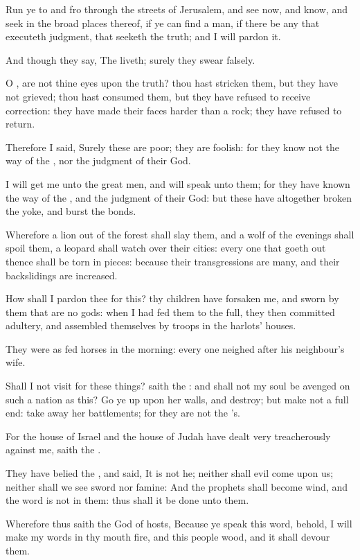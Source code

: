 \Chapter
\Verse Run ye to and fro through the streets of Jerusalem, and see now, and know, and seek in the broad places thereof, if ye can find a man, if there be any that executeth judgment, that seeketh the truth; and I will pardon it.

\Verse And though they say, The \LORD liveth; surely they swear falsely.

\Verse O \LORD, are not thine eyes upon the truth? thou hast stricken them, but they have not grieved; thou hast consumed them, but they have refused to receive correction: they have made their faces harder than a rock; they have refused to return.

\Verse Therefore I said, Surely these are poor; they are foolish: for they know not the way of the \LORD, nor the judgment of their God.

\Verse I will get me unto the great men, and will speak unto them; for they have known the way of the \LORD, and the judgment of their God: but these have altogether broken the yoke, and burst the bonds.

\Verse Wherefore a lion out of the forest shall slay them, and a wolf of the evenings shall spoil them, a leopard shall watch over their cities: every one that goeth out thence shall be torn in pieces: because their transgressions are many, and their backslidings are increased.

\Verse How shall I pardon thee for this? thy children have forsaken me, and sworn by them that are no gods: when I had fed them to the full, they then committed adultery, and assembled themselves by troops in the harlots' houses.

\Verse They were as fed horses in the morning: every one neighed after his neighbour's wife.

\Verse Shall I not visit for these things? saith the \LORD: and shall not my soul be avenged on such a nation as this?  \Verse Go ye up upon her walls, and destroy; but make not a full end: take away her battlements; for they are not the \LORD's.

\Verse For the house of Israel and the house of Judah have dealt very treacherously against me, saith the \LORD.

\Verse They have belied the \LORD, and said, It is not he; neither shall evil come upon us; neither shall we see sword nor famine: \Verse And the prophets shall become wind, and the word is not in them: thus shall it be done unto them.

\Verse Wherefore thus saith the \LORD God of hosts, Because ye speak this word, behold, I will make my words in thy mouth fire, and this people wood, and it shall devour them.

